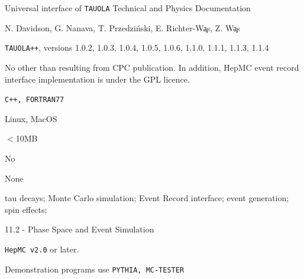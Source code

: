 \documentclass[]{Tauola_interface_design}
\begin{document}
\maketitle

\tableofcontents{}


\newpage


\vspace{10pt}


 \- Universal interface of {\tt TAUOLA} Technical
and Physics Documentation

 \- N. Davidson, G. Nanava, T. Przedzi\'nski, E. Richter-W\c as, Z. W\c as

 \- {\tt TAUOLA++}, versions 1.0.2, 1.0.3, 1.0.4, 1.0.5, 1.0.6, 1.1.0, 1.1.1, 1.1.3, 1.1.4

 \- No other than resulting from CPC publication.
In addition, HepMC event record interface implementation is under the GPL licence.

 \- {\tt C++, FORTRAN77 }

 \- Linux, MacOS

 \- $<$10MB

 \- No

 

 \- None

 \- tau decays; Monte Carlo simulation; Event Record interface; event generation; spin effects;

 11.2 - Phase Space and Event Simulation

 {\tt HepMC v2.0} or later.

 Demonstration programs use {\tt PYTHIA, MC-TESTER}
\end{document}
